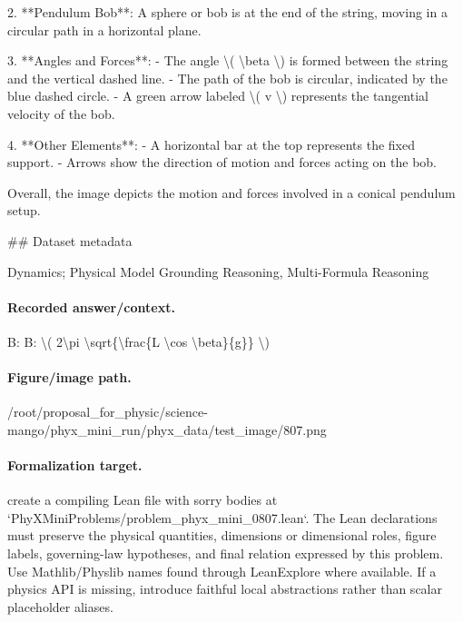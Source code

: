 2. **Pendulum Bob**: A sphere or bob is at the end of the string, moving in a circular path in a horizontal plane.

3. **Angles and Forces**:
   - The angle \textbackslash{}( \textbackslash{}beta \textbackslash{}) is formed between the string and the vertical dashed line.
   - The path of the bob is circular, indicated by the blue dashed circle.
   - A green arrow labeled \textbackslash{}( v \textbackslash{}) represents the tangential velocity of the bob.

4. **Other Elements**: 
   - A horizontal bar at the top represents the fixed support.
   - Arrows show the direction of motion and forces acting on the bob. 

Overall, the image depicts the motion and forces involved in a conical pendulum setup.

\#\# Dataset metadata

Dynamics; Physical Model Grounding Reasoning, Multi-Formula Reasoning

\paragraph{Recorded answer/context.}
B: B: \textbackslash{}( 2\textbackslash{}pi \textbackslash{}sqrt\{\textbackslash{}frac\{L \textbackslash{}cos \textbackslash{}beta\}\{g\}\} \textbackslash{})

\paragraph{Figure/image path.}
/root/proposal\_for\_physic/science-mango/phyx\_mini\_run/phyx\_data/test\_image/807.png

\paragraph{Formalization target.}
create a compiling Lean file with sorry bodies at `PhyXMiniProblems/problem\_phyx\_mini\_0807.lean`. The Lean declarations must preserve the physical quantities, dimensions or dimensional roles, figure labels, governing-law hypotheses, and final relation expressed by this problem.
Use Mathlib/Physlib names found through LeanExplore where available. If a physics API is missing, introduce faithful local abstractions rather than scalar placeholder aliases.

